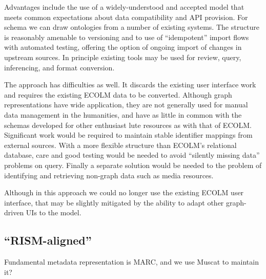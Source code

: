 \documentclass[sigconf]{acmart}
\begin{document}
\begin{sloppypar}
  Advantages include the use of a widely-understood and accepted model
  that meets common expectations about data compatibility and API
  provision. For schema we can draw ontologies from a number of
  existing systems. The structure is reasonably amenable to versioning
  and to use of ``idempotent'' import flows with automated testing,
  offering the option of ongoing import of changes in upstream
  sources. In principle existing tools may be used for review, query,
  inferencing, and format conversion.

  The approach has difficulties as well. It discards the existing user
  interface work and requires the existing ECOLM data to be
  converted. Although graph representations have wide application,
  they are not generally used for manual data management in the
  humanities, and have as little in common with the schemas developed
  for other enthusiast lute resources as with that of
  ECOLM. Significant work would be required to maintain stable
  identifier mappings from external sources. With a more flexible
  structure than ECOLM's relational database, care and good testing
  would be needed to avoid ``silently missing data'' problems on
  query. Finally a separate solution would be needed to the problem of
  identifying and retrieving non-graph data such as media resources.

  Although in this approach we could no longer use the existing ECOLM
  user interface, that may be slightly mitigated by the ability to
  adapt other graph-driven UIs to the model.
  
  \subsection{``RISM-aligned''}

  Fundamental metadata representation is MARC, and we use Muscat to
  maintain it? 
  
\end{sloppypar}
\end{document}
